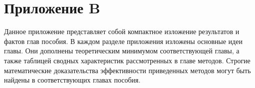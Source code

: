 

\newpage
{}
\pagestyle{empty}
\chapter*{Приложение B}
\vspace{0.5cm}

Данное приложение представляет собой компактное изложение результатов и фактов глав пособия. В каждом разделе приложения изложены основные идеи главы. Они дополнены теоретическим минимумом соответствующей главы, а также таблицей сводных характеристик рассмотренных в главе методов. Строгие математические доказательства эффективности приведенных методов могут быть найдены в соответствующих главах пособия.






